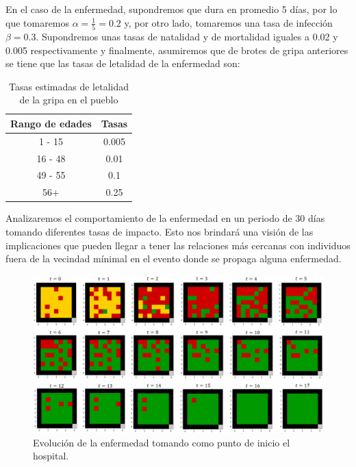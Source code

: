 En el caso de la enfermedad, supondremos que dura en promedio 5 días, por lo que tomaremos $\alpha=\frac{1}{5}=0.2$ y, por otro lado, tomaremos una tasa de infección $\beta=0.3$. Supondremos unas tasas de natalidad y de mortalidad iguales a 0.02 y 0.005 respectivamente y finalmente, asumiremos que de brotes de gripa anteriores se tiene que las tasas de letalidad de la enfermedad son:


\begin{table}[h]
\begin{center}
\begin{tabular}{| c | c |}
\hline
Rango de edades & Tasas \\ \hline
1 - 15 & 0.005 \\
16 - 48 & 0.01 \\
49 - 55 & 0.1 \\
56+ & 0.25 \\\hline
\end{tabular}
\caption{Tasas estimadas de letalidad de la gripa en el pueblo}
\end{center}
\end{table}

Analizaremos el comportamiento de la enfermedad en un periodo de 30 días tomando diferentes tasas de impacto. Esto nos brindará una visión de las implicaciones que pueden llegar a tener las relaciones más cercanas con individuos fuera de la vecindad mínimal en el evento donde se propaga alguna enfermedad.

\begin{figure}[h]
  \centering
    \includegraphics[width=1\textwidth]{Imagenes/evo1.PNG}
    \caption{Evolución de la enfermedad tomando como punto de inicio el hospital.}
    \label{fig:evo1}
\end{figure}

